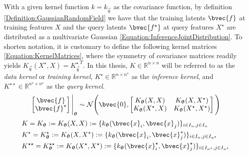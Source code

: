 				With a given kernel function $k = k_{\vec{\uptheta}}$ as the covariance function, by definition \ref{Definition:GaussianRandomField} we have that the training latents $\bvec{f}$ at training features $X$ and the query latents $\bvec{f^{\star}}$ at query features $X^{\star}$ are distributed as a multivariate Gaussian \eqref{Equation:InferenceJointDistribution}. To shorten notation, it is customary to define the following kernel matrices \eqref{Equation:KernelMatrices}, where the symmetry of covariance matrices readily yields $K_{\vec{\uptheta}}(X^{\star}, X) = {K_{\vec{\uptheta}}^{\star}}^{T}$. In this thesis, $K \in \mathbb{R}^{n \times n}$ will be referred to as the \textit{data kernel} or \textit{training kernel}, $K^{\star} \in \mathbb{R}^{n \times n^{\star}}$ as the \textit{inference kernel}, and $K^{\star \star} \in \mathbb{R}^{n^{\star} \times n^{\star}}$ as the \textit{query kernel}. \begin{equation}
					\begin{bmatrix}
						\bvec{f} \\ \bvec{f}^{\star}
					\end{bmatrix} \Bigg|_{\vec{\uptheta}}
					\sim \mathcal{N}\Bigg(\bvec{0}, \begin{bmatrix}
														K_{\vec{\uptheta}}(X, X) & K_{\vec{\uptheta}}(X, X^{\star}) \\
														K_{\vec{\uptheta}}(X^{\star}, X) & K_{\vec{\uptheta}}(X^{\star}, X^{\star}) \\
													\end{bmatrix}  \Bigg)
				\label{Equation:InferenceJointDistribution}
				\end{equation} \begin{equation}
					\begin{aligned}
						& K = K_{\vec{\uptheta}} := K_{\vec{\uptheta}}(X, X) := \{k_{\vec{\uptheta}}(\bvec{x}_{i}, \bvec{x}_{j})\}_{i \in I_{n}, j \in I_{n}} \\
						& K^{\star} = K_{\vec{\uptheta}}^{\star} := K_{\vec{\uptheta}}(X, X^{\star}) := \{k_{\vec{\uptheta}}(\bvec{x}_{i}, \bvec{x}^{\star}_{j})\}_{i \in I_{n}, j \in I_{n^{\star}}} \\
						& K^{\star \star} = K_{\vec{\uptheta}}^{\star \star} := K_{\vec{\uptheta}}(X^{\star}, X^{\star}) := \{k_{\vec{\uptheta}}(\bvec{x}^{\star}_{i}, \bvec{x}^{\star}_{j})\}_{i \in I_{n^{\star}}, j \in I_{n^{\star}}}
					\end{aligned}
				\label{Equation:KernelMatrices}

\end{equation}
